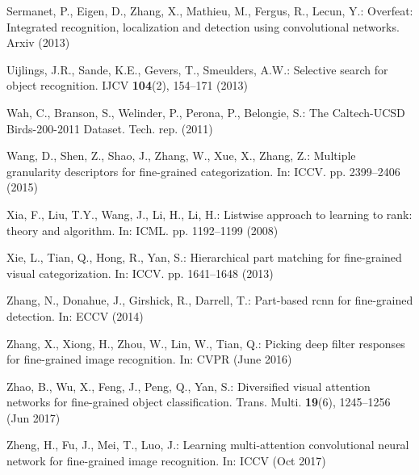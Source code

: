 \documentclass[runningheads]{llncs}
\begin{document}
\begin{thebibliography}{10}
Sermanet, P., Eigen, D., Zhang, X., Mathieu, M., Fergus, R., Lecun, Y.:
  Overfeat: Integrated recognition, localization and detection using
  convolutional networks. Arxiv  (2013)

Uijlings, J.R., Sande, K.E., Gevers, T., Smeulders, A.W.: Selective search for
  object recognition. IJCV  \textbf{104}(2),  154--171 (2013)

Wah, C., Branson, S., Welinder, P., Perona, P., Belongie, S.: {The Caltech-UCSD
  Birds-200-2011 Dataset}. Tech. rep. (2011)

Wang, D., Shen, Z., Shao, J., Zhang, W., Xue, X., Zhang, Z.: Multiple
  granularity descriptors for fine-grained categorization. In: ICCV. pp.
  2399--2406 (2015)

Xia, F., Liu, T.Y., Wang, J., Li, H., Li, H.: Listwise approach to learning to
  rank: theory and algorithm. In: ICML. pp. 1192--1199 (2008)

Xie, L., Tian, Q., Hong, R., Yan, S.: Hierarchical part matching for
  fine-grained visual categorization. In: ICCV. pp. 1641--1648 (2013)

Zhang, N., Donahue, J., Girshick, R., Darrell, T.: Part-based rcnn for
  fine-grained detection. In: ECCV (2014)

Zhang, X., Xiong, H., Zhou, W., Lin, W., Tian, Q.: Picking deep filter
  responses for fine-grained image recognition. In: CVPR (June 2016)

Zhao, B., Wu, X., Feng, J., Peng, Q., Yan, S.: Diversified visual attention
  networks for fine-grained object classification. Trans. Multi.
  \textbf{19}(6),  1245--1256 (Jun 2017)

Zheng, H., Fu, J., Mei, T., Luo, J.: Learning multi-attention convolutional
  neural network for fine-grained image recognition. In: ICCV (Oct 2017)

\end{thebibliography}
 
\end{document}
